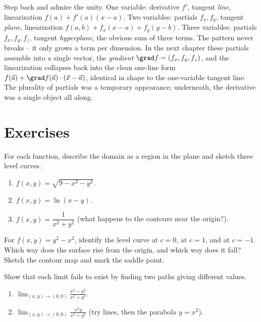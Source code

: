 \begin{aestheticbox}
Step back and admire the unity. One variable: derivative $f'$, tangent \emph{line},
linearization $f(a)+f'(a)(x-a)$. Two variables: partials $f_x,f_y$, tangent \emph{plane},
linearization $f(a,b)+f_x(x-a)+f_y(y-b)$. Three variables: partials $f_x,f_y,f_z$, tangent
\emph{hyperplane}, the obvious sum of three terms. The pattern never breaks -- it only grows a
term per dimension. In the next chapter these partials assemble into a single vector, the
\emph{gradient} $\grad f = (f_x, f_y, f_z)$, and the linearization collapses back into the clean
one-line form $f(\vec a) + \grad f(\vec a)\cdot(\vec x - \vec a)$, identical in shape to the
one-variable tangent line. The plurality of partials was a temporary appearance; underneath, the
derivative was a single object all along.
\end{aestheticbox}

\section{Exercises}
\label{ch32:sec-exercises}

\begin{exercise}
\label{ch32:exc-domain}
For each function, describe the domain as a region in the plane and sketch three level curves.
\begin{enumerate}[label=(\alph*)]
  \item $f(x,y)=\sqrt{9-x^2-y^2}$.
  \item $f(x,y)=\ln(x-y)$.
  \item $f(x,y)=\dfrac{1}{x^2+y^2}$ (what happens to the contours near the origin?).
\end{enumerate}
\end{exercise}

\begin{exercise}
\label{ch32:exc-saddle}
For $f(x,y)=y^2-x^2$, identify the level curve at $c=0$, at $c=1$, and at $c=-1$. Which way does
the surface rise from the origin, and which way does it fall? Sketch the contour map and mark the
saddle point.
\end{exercise}

\begin{exercise}
\label{ch32:exc-twopath}
Show that each limit fails to exist by finding two paths giving different values.
\begin{enumerate}[label=(\alph*)]
  \item $\displaystyle\lim_{(x,y)\to(0,0)} \frac{x^2-y^2}{x^2+y^2}$.
  \item $\displaystyle\lim_{(x,y)\to(0,0)} \frac{x^2 y}{x^4+y^2}$ (try lines, then the parabola
  $y=x^2$).
\end{enumerate}
\end{exercise}

